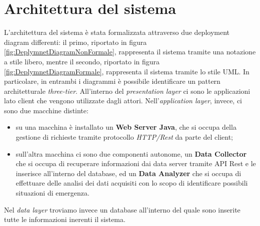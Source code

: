 \clearpage
\section{Architettura del sistema}
L'architettura del sistema è stata formalizzata attraverso due deployment diagram differenti: il primo, riportato in figura \ref{fig:DeplymnetDiagramNonFormale}, rappresenta il sistema tramite una notazione a stile libero, mentre il secondo, riportato in figura \ref{fig:DeplymnetDiagramFormale}, rappresenta il sistema tramite lo stile UML. In particolare, in entrambi i diagrammi è possibile identificare un pattern architetturale \textit{three-tier}. All'interno del \textit{presentation layer} ci sono le applicazioni lato client che vengono utilizzate dagli attori. Nell'\textit{application layer}, invece, ci sono due macchine distinte:

\begin{itemize}
	\item su una macchina è installato un \textbf{Web Server Java}, che si occupa della gestione di richieste tramite protocollo \textit{HTTP/Rest} da parte del client;
	\item sull'altra macchina ci sono due componenti autonome, un \textbf{Data Collector} che si occupa di recuperare informazioni dai data server tramite API Rest e le inserisce all'interno del database, ed un \textbf{Data Analyzer} che si occupa di effettuare delle analisi dei dati acquisiti con lo scopo di identificare possibili situazioni di emergenza.
\end{itemize}

Nel \textit{data layer} troviamo invece un database all'interno del quale sono inserite tutte le informazioni inerenti il sistema.


